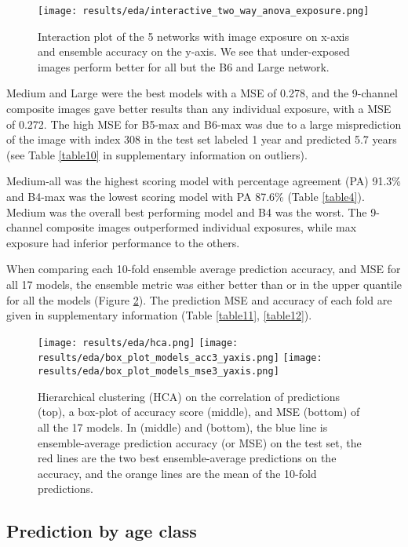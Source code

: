 \documentclass[10pt,letterpaper]{article}
\begin{document}
\begin{figure}[htpb!]
\centering
\texttt{[image: results/eda/interactive\_two\_way\_anova\_exposure.png]}
  \caption{Interaction plot of the 5 networks
  with image exposure on x-axis and 
  ensemble accuracy on the y-axis. We
  see that under-exposed images perform
  better for all but the B6 and Large network.}
  \label{marker20}
\end{figure}

Medium and Large were the best models with a MSE of 0.278,
and the 9-channel composite images gave better results than any individual exposure, with a MSE of 0.272.
The high MSE for B5-max and B6-max was due to a large misprediction of the image with index 308 in the test set labeled 1 year and predicted 5.7 years (see Table \ref{table10} in supplementary information on outliers).

Medium-all was the highest scoring model with percentage agreement (PA) 91.3\% and B4-max was the lowest scoring model with PA 87.6\% (Table {\ref{table4}}). Medium was the overall best performing model and B4 was the worst. The 9-channel composite images outperformed individual exposures, while max exposure had inferior performance to the others.

When comparing each 10-fold ensemble average prediction accuracy, and MSE for all 17 models, 
the ensemble metric was either better than or in the upper quantile for all the models (Figure \ref{marker10}). The prediction MSE and accuracy of each fold are given in supplementary information (Table \ref{table11}, \ref{table12}).

\begin{figure}[htp!]
\centering
\texttt{[image: results/eda/hca.png]}
\texttt{[image: results/eda/box\_plot\_models\_acc3\_yaxis.png]}
\texttt{[image: results/eda/box\_plot\_models\_mse3\_yaxis.png]}
    \caption{Hierarchical clustering (HCA) on the correlation of predictions (top), a box-plot of accuracy score (middle), and MSE (bottom) of all the 17 models. In (middle) and (bottom), the blue line is ensemble-average prediction accuracy (or MSE) on the test set, the red lines are the two best ensemble-average predictions on the accuracy, and the orange lines are the mean of the 10-fold predictions.}
  \label{marker10}
\end{figure}

\subsection{Prediction by age class}
\end{document}

